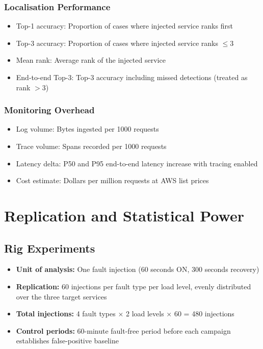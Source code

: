 \subsubsection{Localisation Performance}
\begin{itemize}
    \item Top-1 accuracy: Proportion of cases where injected service ranks first
    \item Top-3 accuracy: Proportion of cases where injected service ranks $\leq$3
    \item Mean rank: Average rank of the injected service
    \item End-to-end Top-3: Top-3 accuracy including missed detections (treated as rank $>$3)
\end{itemize}

\subsubsection{Monitoring Overhead}
\begin{itemize}
    \item Log volume: Bytes ingested per 1000 requests
    \item Trace volume: Spans recorded per 1000 requests
    \item Latency delta: P50 and P95 end-to-end latency increase with tracing enabled
    \item Cost estimate: Dollars per million requests at AWS list prices
\end{itemize}

\section{Replication and Statistical Power}

\subsection{Rig Experiments}
\begin{itemize}
    \item \textbf{Unit of analysis:} One fault injection (60 seconds ON, 300 seconds recovery)
    \item \textbf{Replication:} 60 injections per fault type per load level, evenly distributed over the three target services
    \item \textbf{Total injections:} 4 fault types × 2 load levels × 60 = 480 injections
    \item \textbf{Control periods:} 60-minute fault-free period before each campaign establishes false-positive baseline
\end{itemize}

